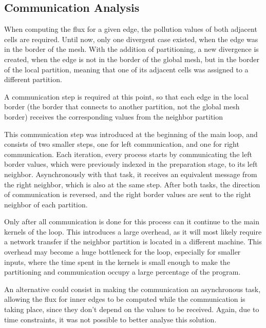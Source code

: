 \subsection{Communication Analysis}
\label{subsec:mpi:comm}

When computing the flux for a given edge, the pollution values of both adjacent cells are required. Until now, only one divergent case existed, when the edge was in the border of the mesh. With the addition of partitioning, a new divergence is created, when the edge is not in the border of the global mesh, but in the border of the local partition, meaning that one of its adjacent cells was assigned to a different partition.

A communication step is required at this point, so that each edge in the local border (the border that connects to another partition, not the global mesh border) receives the corresponding values from the neighbor partition 

This communication step was introduced at the beginning of the main loop, and consists of two smaller steps, one for left communication, and one for right communication.
Each iteration, every process starts by communicating the left border values, which were previously indexed in the preparation stage, to its left neighbor. Asynchronously with that task, it receives an equivalent message from the right neighbor, which is also at the same step. After both tasks, the direction of communication is reversed, and the right border values are sent to the right neighbor of each partition.

Only after all communication is done for this process can it continue to the main kernels of the loop. This introduces a large overhead, as it will most likely require a network transfer if the neighbor partition is located in a different machine. This overhead may become a huge bottleneck for the loop, especially for smaller inputs, where the time spent in the kernels is small enough to make the partitioning and communication occupy a large percentage of the program.

An alternative could consist in making the communication an asynchronous task, allowing the flux for inner edges to be computed while the communication is taking place, since they don't depend on the values to be received. Again, due to time constraints, it was not possible to better analyse this solution.
